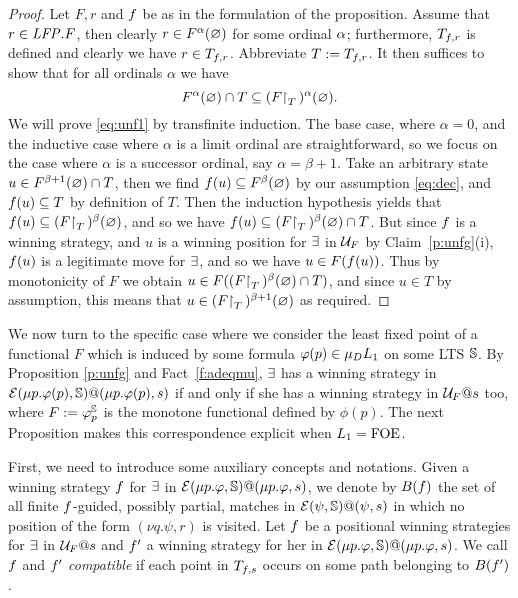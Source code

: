 \begin{proof}
Let $F,r$ and $f$ be as in the formulation of the proposition.
Assume that $r \in \mathit{LFP}. F$, then clearly $r \in F^{\alpha}(\varnothing)$ for some 
ordinal $\alpha$; furthermore, $T_{f,r}$ is defined and clearly we have 
$r \in T_{f,r}$.
Abbreviate $T \mathrel{:=} T_{f,r}$.
It then suffices to show that for all ordinals $\alpha$ we have
\begin{equation}
\label{eq:unf1}
F^{\al}(\nada) \cap T \sse (F\rst{T})^{\alpha}(\nada).
\end{equation}
We will prove \eqref{eq:unf1} by transfinite induction.
The base case, where $\alpha = 0$, and the inductive case where $\alpha$ is a 
limit ordinal are straightforward, so we focus on the case where $\alpha$ is a 
successor ordinal, say $\alpha = \beta +1$.
Take an arbitrary state $u \in F^{\beta+1}(\varnothing) \cap T$, then we 
find $f(u) \subseteq F^{\beta}(\varnothing)$ by our assumption \eqref{eq:dec}, and 
$f(u) \subseteq T$ by definition of $T$.
Then the induction hypothesis yields that 
$f(u) \subseteq (F{\upharpoonright}_{T}\,)^{\beta}(\varnothing)$, and so we have 
$f(u) \subseteq (F{\upharpoonright}_{T}\,)^{\beta}(\varnothing) \cap T$.
But since $f$ is a winning strategy, and $u$ is a winning position for 
$\exists$ in $\mathcal{U}_{F}$ by Claim~\ref{p:unfg}(i), $f(u)$ is a
legitimate move for $\exists$, and so we have $u \in F(f(u))$.
Thus by monotonicity of $F$ we obtain $u \in 
F((F{\upharpoonright}_{T}\,)^{\beta}(\varnothing) \cap T)$, and since $u \in T$ 
by assumption, this means that $u \in (F{\upharpoonright}_{T}\,)^{\beta+1}(\varnothing)$ as 
required.
\end{proof}

We now turn to the specific case where we consider the least fixed point of a 
functional $F$ which is induced by some formula $\varphi(p) \in 
\mu_{D}L_{1}$ on some LTS $\mathbb{S}$.   
By Proposition \ref{p:unfg} and Fact~\ref{f:adeqmu}, $\exists$ has a winning
strategy in  $\mathcal{E}(\mu p.\varphi(p),\mathbb{S})@(\mu p.\varphi(p),s)$ if and only if she
has a winning strategy in $\mathcal{U}_{F}@s$ too, where $F \mathrel{:=}  \varphi_{p}^{\mathbb{S}}$ is the 
monotone functional defined by $\phi(p)$. 
The next Proposition  makes this correspondence explicit when $L_{1} =
\mathrm{FOE}$. 


First, we need to introduce some auxiliary concepts and notations.
Given  a winning strategy   $f$ for $\exists$ in $\mathcal{E}(\mu p. \varphi,
\mathbb{S})@(\mu p. \varphi,s)$, we denote by $B(f)$ the set of all finite 
$f$-guided, possibly partial, matches in  $\mathcal{E}(\psi,\mathbb{S})@(\psi,s)$ in
which no position of the form $(\nu q. \psi, r)$ is visited. Let 
$f$ be a positional winning strategies for $\exists$ in $\mathcal{U}_F@s$ and 
$f'$ a winning strategy  for her in $\mathcal{E}(\mu p.\varphi,\mathbb{S})@(\mu p.\varphi,
s)$. We call $f$ and  $f'$  \emph{compatible} if
each point in $T_{f,s}$ occurs on some path belonging to $B(f')$. 

